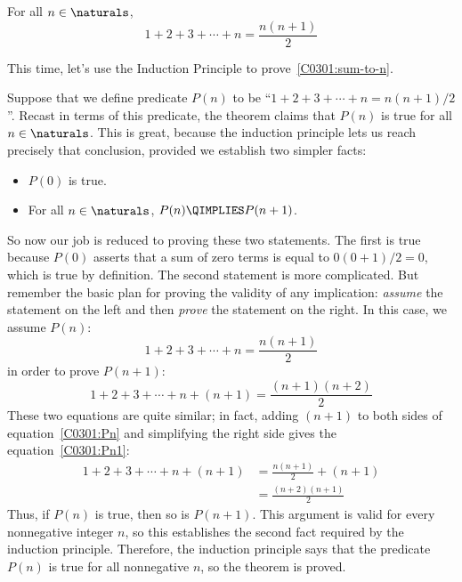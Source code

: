 \begin{theorem}
\label{C0301:sum-to-n}
For all $n \in \naturals$,
\begin{equation}\label{C0301:hyp}
1 + 2 + 3 + \cdots + n = \frac{n(n+1)}{2}
\end{equation}
\end{theorem}

This time, let's use the Induction Principle to
prove~\ref{C0301:sum-to-n}.

Suppose that we define predicate $P(n)$ to be
``$1 + 2 + 3 + \cdots + n = n(n+1)/2$''.  Recast in terms of this
predicate, the theorem claims that $P(n)$ is true for all $n \in
\naturals$.  This is great, because the induction principle lets us reach
precisely that conclusion, provided we establish two simpler facts:
%
\begin{itemize}
\item $P(0)$ is true.
\item For all $n \in \naturals$, $P(n) \QIMPLIES P(n+1)$.
\end{itemize}

So now our job is reduced to proving these two statements.  The first
is true because $P(0)$ asserts that a sum of zero terms is equal to
$0(0+1)/2 = 0$, which is true by definition.
%
The second statement is more complicated.  But remember the basic plan
for proving the validity of any implication: \textit{assume} the
statement on the left and then \textit{prove} the statement on the
right.  In this case, we assume $P(n)$:
\begin{equation}\label{C0301:Pn}
1 + 2 + 3 + \cdots + n  = \frac{n(n+1)}{2}
\end{equation}
in order to prove $P(n+1)$:
\begin{equation}\label{C0301:Pn1}
1 + 2 + 3 + \cdots + n + (n+1) = \frac{(n+1)(n+2)}{2}
\end{equation}
These two equations are quite similar; in fact, adding $(n+1)$ to both
sides of equation~\eqref{C0301:Pn} and simplifying the right side 
gives the equation~\eqref{C0301:Pn1}:
\begin{align*}
1 + 2 + 3 + \cdots + n + (n+1)
    & = \frac{n(n+1)}{2} + (n+1) \\
    & = \frac{(n+2)(n+1)}{2}
\end{align*}
Thus, if $P(n)$ is true, then so is $P(n+1)$.  This argument is valid
for every nonnegative integer $n$, so this establishes the second fact
required by the induction principle.  Therefore, the induction principle
says that the predicate $P(n)$ is true for all nonnegative $n$, so the 
theorem is proved.

